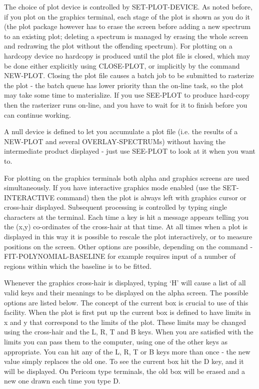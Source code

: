 \documentclass[11pt,twoside]{report}
\begin{document}
The choice of plot device is controlled by SET-PLOT-DEVICE.
As noted before, if you plot on the graphics terminal, each stage of the plot
is shown as you do it (the plot package however has to erase the screen before
adding a new spectrum to an existing plot; deleting a spectrum is managed by
erasing the whole screen and redrawing the plot without the offending
spectrum). For plotting on a hardcopy device no hardcopy is produced until the
plot file is closed, which may be done either explicitly using CLOSE-PLOT, or
implicitly by the command NEW-PLOT. Closing the plot file causes a batch
job to be submitted to rasterize the plot - the batch
queue has lower priority than the on-line task, so the plot may take some time
to materialize. If you use SEE-PLOT to produce hard-copy then the
rasterizer runs on-line, and you have to wait for it to
finish before you can continue working. 

A null device is defined to let you accumulate a
plot file (i.e. the results of a NEW-PLOT and several OVERLAY-SPECTRUMs) without
having the intermediate product displayed - just use SEE-PLOT to look at it
when you want to. 

For plotting on the graphics terminals both alpha and graphics screens are used
simultaneously.  If you have interactive graphics mode enabled (use
the SET-INTERACTIVE command) then the plot is always left with graphics cursor
or cross-hair displayed. 
Subsequent processing is controlled by typing single characters at the
terminal. Each time a key is hit a message appears telling you the (x,y)
co-ordinates of the cross-hair at that time. At all times when a plot is
displayed in this way it is possible to rescale the plot interactively, or to
measure positions on the screen. Other options are possible, depending on the
command - FIT-POLYNOMIAL-BASELINE for example requires input of a number of
regions within which the baseline is to be fitted. 

Whenever the graphics cross-hair is displayed, typing `H' will cause a list of
all valid keys  and their meanings to be
displayed on the alpha screen. The possible options are listed below. The
concept of the current box   is crucial
to use of this facility. When the plot is first put up the current box is
defined to have limits in x and y that correspond to the limits of the plot.
These limits may be changed using the cross-hair and the L, R, T and B keys.
When you are satisfied with the limits you can pass them to the computer, using
one of the other keys as appropriate. You can hit any of the L, R, T or B keys
more than once - the new value simply replaces the old one. To see the current
box hit the D key, and it will be displayed. On Pericom type terminals, the old
box will be erased and a new one drawn each time you type D. 
\end{document}
